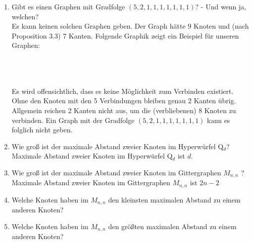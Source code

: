 \begin{enumerate}[label=(\alph*)]
        \item Gibt es einen Graphen mit Gradfolge $(5, 2, 1, 1, 1, 1, 1, 1, 1)$? - Und wenn ja, welchen?\\
        Es kann keinen solchen Graphen geben. Der Graph hätte 9 Knoten und (nach Proposition 3.3) 7 Kanten. 
        Folgende Graphik zeigt ein Beispiel für unseren Graphen: 
        \\\\
        \\\\
        Es wird offensichtlich, dass es keine Möglichkeit zum Verbinden existiert. Ohne den Knoten mit 
        den 5 Verbindungen bleiben genau 2 Kanten übrig. Allgemein reichen 2 Kanten  nicht aus, um die 
        (verbliebenen) 8 Knoten zu verbinden. Ein Graph mit der Gradfolge $(5,2,1,1,1,1,1,1,1)$ kann es 
        folglich nicht geben. 
         
        \item Wie groß ist der maximale Abstand zweier Knoten im Hyperwürfel Q$_d$? \\
        Maximale Abstand zweier Knoten im Hyperwürfel Q$_d$ ist $d$.
        
        \item Wie groß ist der maximale Abstand zweier Knoten im Gittergraphen $M_{n,n}$ ? \\
        Maximale Abstand zweier Knoten im Gittergraphen $M_{n,n}$ ist $2n - 2$
        
        \item Welche Knoten haben im $M_{n,n}$ den kleinsten maximalen Abstand zu einem anderen Knoten? \\
        
        \item Welche Knoten haben im $M_{n,n}$ den größten maximalen Abstand zu einem anderen Knoten? \\
        

\end{enumerate}
